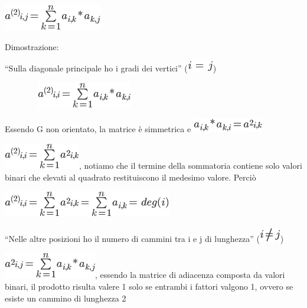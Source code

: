 \documentclass{article}
\begin{document}
\includegraphics{images/image409.png}

{}

{Dimostrazione}{:}

{``Sulla diagonale principale ho i gradi dei vertici''
(}\includegraphics{images/image410.png}{)}

{~~~~~~~~}\includegraphics{images/image411.png}

{Essendo G non orientato, la matrice è simmetrica e
}\includegraphics{images/image412.png}

\includegraphics{images/image413.png}{, notiamo che il termine della
sommatoria contiene solo valori binari che elevati al quadrato
restituiscono il medesimo valore. Perciò}

\includegraphics{images/image414.png}

{}

{``Nelle altre posizioni ho il numero di cammini tra i e j di
lunghezza'' (}\includegraphics{images/image415.png}{)}

\includegraphics{images/image416.png}{, essendo la matrice di adiacenza
composta da valori binari, il prodotto risulta valere 1 solo se entrambi
i fattori valgono 1, ovvero se esiste un cammino di lunghezza 2}

{}
\end{document}
